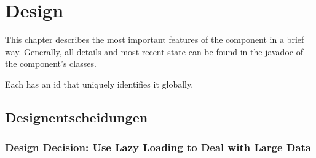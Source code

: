 
\section{\COMPdataPartManagement{} Design}
\label{sec:COMPdataPartManagementImplementationDesign}

This chapter describes the most important features of the \COMPdataPartManagement{} component in a brief way. Generally, all details and most recent state can be found in the javadoc of the component's classes.

Each \TERMdataBlock{} has an id that uniquely identifies it globally.


\subsection{Designentscheidungen \COMPdataPartManagement{}}
\label{sec:InterfaceDesignCOMPdataPartManagementDES}


\subsubsection{Design Decision: Use Lazy Loading to Deal with Large Data}
\label{sec:LazyLoading}

